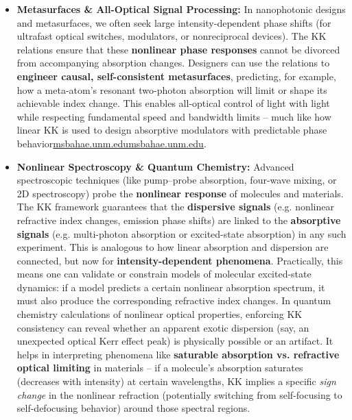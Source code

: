 \documentclass[11pt,a4paper]{article}
\begin{document}
\begin{itemize}
  \item \textbf{Metasurfaces \& All-Optical Signal Processing:} In nanophotonic designs and metasurfaces, we often seek large intensity-dependent phase shifts (for ultrafast optical switches, modulators, or nonreciprocal devices). The KK relations ensure that these \textbf{nonlinear phase responses} cannot be divorced from accompanying absorption changes. Designers can use the relations to \textbf{engineer causal, self-consistent metasurfaces}, predicting, for example, how a meta-atom’s resonant two-photon absorption will limit or shape its achievable index change. This enables all-optical control of light with light while respecting fundamental speed and bandwidth limits – much like how linear KK is used to design absorptive modulators with predictable phase behavior\href{https://msbahae.unm.edu/Courses/568%20Nonlinear%20Optics/OSA-Handbook%20of%20Optics-IV-Ch17.pdf#:~:text=recently%2C however ,It is}{msbahae.unm.edu}\href{https://msbahae.unm.edu/Courses/568%20Nonlinear%20Optics/OSA-Handbook%20of%20Optics-IV-Ch17.pdf#:~:text=the fact that our new,∞ −∞ − %2B ∆}{msbahae.unm.edu}.
  \item \textbf{Nonlinear Spectroscopy \& Quantum Chemistry:} Advanced spectroscopic techniques (like pump–probe absorption, four-wave mixing, or 2D spectroscopy) probe the \textbf{nonlinear response} of molecules and materials. The KK framework guarantees that the \textbf{dispersive signals} (e.g. nonlinear refractive index changes, emission phase shifts) are linked to the \textbf{absorptive signals} (e.g. multi-photon absorption or excited-state absorption) in any such experiment. This is analogous to how linear absorption and dispersion are connected, but now for \textbf{intensity-dependent phenomena}. Practically, this means one can validate or constrain models of molecular excited-state dynamics: if a model predicts a certain nonlinear absorption spectrum, it must also produce the corresponding refractive index changes. In quantum chemistry calculations of nonlinear optical properties, enforcing KK consistency can reveal whether an apparent exotic dispersion (say, an unexpected optical Kerr effect peak) is physically possible or an artifact. It helps in interpreting phenomena like \textbf{saturable absorption vs. refractive optical limiting} in materials – if a molecule’s absorption saturates (decreases with intensity) at certain wavelengths, KK implies a specific \emph{sign change} in the nonlinear refraction (potentially switching from self-focusing to self-defocusing behavior) around those spectral regions.

\end{itemize}
\end{document}
